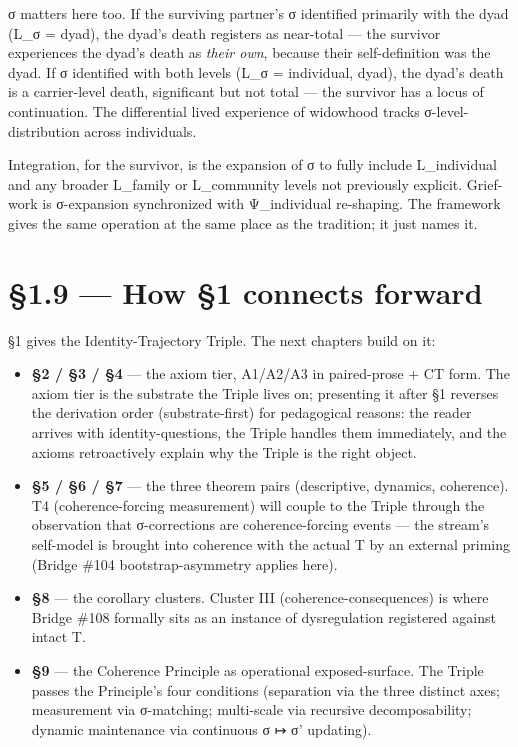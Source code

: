 \documentclass[11pt, openany]{book}
\newcommand{\sectionbreak}{\clearpage}
\begin{document}
σ matters here too. If the surviving partner's σ identified primarily with the dyad (L\_\allowbreak{}σ = {dyad}), the dyad's death registers as near-total --- the survivor experiences the dyad's death as \textit{their own}, because their self-definition was the dyad. If σ identified with both levels (L\_\allowbreak{}σ = {individual, dyad}), the dyad's death is a carrier-level death, significant but not total --- the survivor has a locus of continuation. The differential lived experience of widowhood tracks σ-level-distribution across individuals.

Integration, for the survivor, is the expansion of σ to fully include L\_\allowbreak{}individual and any broader L\_\allowbreak{}family or L\_\allowbreak{}community levels not previously explicit. Grief-work is σ-expansion synchronized with Ψ\_\allowbreak{}individual re-shaping. The framework gives the same operation at the same place as the tradition; it just names it.

\sectionbreak

\section{§1.9 --- How §1 connects forward}

§1 gives the Identity-Trajectory Triple. The next chapters build on it:

\begin{itemize}
\item \textbf{§2 / §3 / §4} --- the axiom tier, A1/A2/A3 in paired-prose + CT form. The axiom tier is the substrate the Triple lives on; presenting it after §1 reverses the derivation order (substrate-first) for pedagogical reasons: the reader arrives with identity-questions, the Triple handles them immediately, and the axioms retroactively explain why the Triple is the right object.

\item \textbf{§5 / §6 / §7} --- the three theorem pairs (descriptive, dynamics, coherence). T4 (coherence-forcing measurement) will couple to the Triple through the observation that σ-corrections are coherence-forcing events --- the stream's self-model is brought into coherence with the actual T by an external priming (Bridge \#104 bootstrap-asymmetry applies here).

\item \textbf{§8} --- the corollary clusters. Cluster III (coherence-consequences) is where Bridge \#108 formally sits as an instance of dysregulation registered against intact T.

\item \textbf{§9} --- the Coherence Principle as operational exposed-surface. The Triple passes the Principle's four conditions (separation via the three distinct axes; measurement via σ-matching; multi-scale via recursive decomposability; dynamic maintenance via continuous σ ↦ σ' updating).
\end{itemize}
\end{document}
